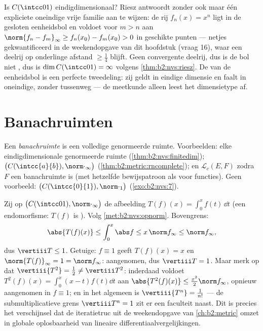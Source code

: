 \begin{example}\label{ex:b2:nvs:rieszdetector}
Is $C(\intcc01)$ eindigdimensionaal? Riesz antwoordt zonder ook
maar één expliciete oneindige vrije familie aan te wijzen: de rij
$f_n(x) = x^n$ ligt in de gesloten eenheidsbol en voldoet voor $m >
n$ aan $\norm{f_n - f_m}_\infty \geq f_n(x_0) - f_m(x_0) > 0$ in
geschikte punten --- netjes gekwantificeerd in de weekendopgave van
dit hoofdstuk (vraag 16), waar een deelrij op onderlinge afstand
$\geq \frac14$ blijft. Geen convergente deelrij, dus is de bol niet
, dus is $\dim C(\intcc01) = \infty$ volgens
\cref{thm:b2:nvs:riesz}. De  van de eenheidsbol is een
perfecte tweedeling: zij geldt in eindige dimensie en faalt in
oneindige, zonder tussenweg --- de meetkunde alleen leest het
dimensietype af.
\end{example}

\section{Banachruimten}

\begin{definition}\label{def:b2:nvs:banach}
Een \emph{banachruimte} is een volledige
genormeerde ruimte. Voorbeelden: elke eindigdimensionale
genormeerde ruimte (\cref{thm:b2:nvs:finitedim});
$\bigl(C(\intcc{a}{b}), \norm\cdot_\infty\bigr)$
(\cref{thm:b2:metric:rncomplete}); en $\mathcal{L}_c(E, F)$ zodra
$F$ een banachruimte is (met hetzelfde bewijspatroon als voor
 functies). Geen voorbeeld: $\bigl(C(\intcc{0}{1}),
\norm\cdot_1\bigr)$ (\cref{exo:b2:nvs:7}).
\end{definition}

\begin{example}\label{ex:b2:nvs:integrationnorm}
Zij op $\bigl(C(\intcc01), \norm\cdot_\infty\bigr)$ de afbeelding
$T(f)(x) = \int_0^x f(t)\,\dd t$ (een endomorfisme: $T(f)$ is
). Volg \cref{met:b2:nvs:opnorm}. Bovengrens:
\[
\abs{T(f)(x)} \leq \int_0^x\abs f \leq x\,\norm f_\infty \leq
\norm f_\infty ,
\]
dus $\vertiii T \leq 1$. Getuige: $f \equiv 1$ geeft $T(f)(x) = x$
en $\norm{T(f)}_\infty = 1 = \norm f_\infty$: aangenomen, dus
$\vertiii T = 1$. Maar merk op dat $\vertiii{T^2} = \frac12 \neq
\vertiii T^2$: inderdaad voldoet $T^2(f)(x) = \int_0^x(x -
t)f(t)\dd t$ aan $\abs{T^2(f)(x)} \leq \frac{x^2}2\norm f_\infty$,
opnieuw aangenomen in $f \equiv 1$; en in het algemeen is
$\vertiii{T^n} = \frac1{n!}$ --- de submultiplicatieve grens
$\vertiii T^n = 1$ zit er een faculteit naast. Dit is precies het
verschijnsel dat de iteratietruc uit de weekendopgave van
\cref{ch:b2:metric} omzet in globale oplosbaarheid van lineaire
differentiaalvergelijkingen.
\end{example}

